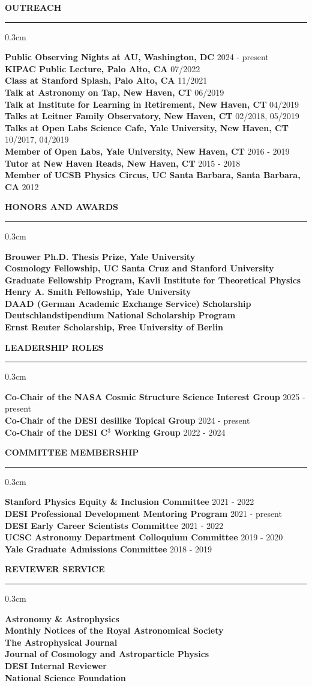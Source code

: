 \documentclass[12pt]{article}
\renewenvironment{section}[1]
  {
  \medskip
  {\color{aublue} \MakeUppercase{\bf #1}}
  \smallskip
  \hrule
  \medskip
  \begin{adjustwidth}{0.3cm}{}
  }
  {
  \end{adjustwidth}
  }
\newcommand{\entry}[3]{{\bf #1} \hfill {#2} \\ {#3}}
\begin{document}
\begin{section}{Outreach}
  \entry{Public Observing Nights at AU, Washington, DC}{2024 - present}{}
  \entry{KIPAC Public Lecture, Palo Alto, CA}{07/2022}{}
  \entry{Class at Stanford Splash, Palo Alto, CA}{11/2021}{}
  \entry{Talk at Astronomy on Tap, New Haven, CT}{06/2019}{}
  \entry{Talk at Institute for Learning in Retirement, New Haven, CT}{04/2019}{}
  \entry{Talks at Leitner Family Observatory, New Haven, CT}{02/2018, 05/2019}{}
  \entry{Talks at Open Labs Science Cafe, Yale University, New Haven, CT}{10/2017,  04/2019}{}
  \entry{Member of Open Labs, Yale University, New Haven, CT}{2016 - 2019}{}
  \entry{Tutor at New Haven Reads, New Haven, CT}{2015 - 2018}{}
  \entry{Member of UCSB Physics Circus, UC Santa Barbara, Santa Barbara, CA}{2012}{}
\end{section}

\begin{section}{Honors and Awards}
  \entry{Brouwer Ph.D. Thesis Prize, Yale University}{}{}
  \entry{Cosmology Fellowship, UC Santa Cruz and Stanford University}{}{}
  \entry{Graduate Fellowship Program, Kavli Institute for Theoretical Physics}{}{}
  \entry{Henry A. Smith Fellowship, Yale University}{}{}
  \entry{DAAD (German Academic Exchange Service) Scholarship}{}{}
  \entry{Deutschlandstipendium National Scholarship Program}{}{}
  \entry{Ernst Reuter Scholarship, Free University of Berlin}{}{}
\end{section}

\begin{section}{Leadership Roles}
  \entry{Co-Chair of the NASA Cosmic Structure Science Interest Group}{2025 - present}{}
  \entry{Co-Chair of the DESI desilike Topical Group}{2024 - present}{}
  \entry{Co-Chair of the DESI C$^3$ Working Group}{2022 - 2024}{}
\end{section}

\begin{section}{Committee Membership}
  \entry{Stanford Physics Equity \& Inclusion Committee}{2021 - 2022}{}
  \entry{DESI Professional Development Mentoring Program}{2021 - present}{}
  \entry{DESI Early Career Scientists Committee}{2021 - 2022}{}
  \entry{UCSC Astronomy Department Colloquium Committee}{2019 - 2020}{}
  \entry{Yale Graduate Admissions Committee}{2018 - 2019}{}
\end{section}

\begin{section}{Reviewer Service}
  \entry{Astronomy \& Astrophysics}{}{}
  \entry{Monthly Notices of the Royal Astronomical Society}{}{}
  \entry{The Astrophysical Journal}{}{}
  \entry{Journal of Cosmology and Astroparticle Physics}{}{}
  \entry{DESI Internal Reviewer}{}{}
  \entry{National Science Foundation}{}{}
\end{section}
\end{document}
